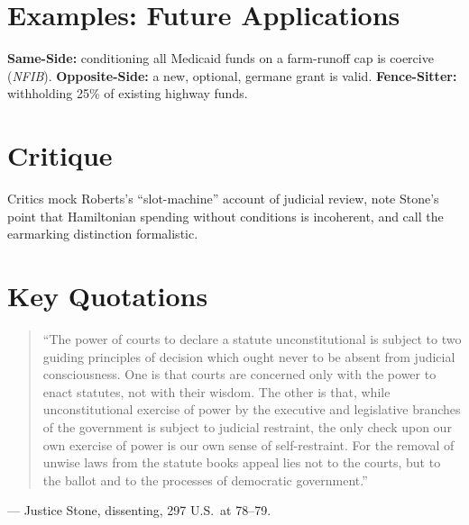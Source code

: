 \documentclass[12pt]{article}
\begin{document}
\section{Examples: Future Applications}
\textbf{Same-Side:} conditioning all Medicaid funds on a farm-runoff cap is coercive (\textit{NFIB}). \textbf{Opposite-Side:} a new, optional, germane grant is valid. \textbf{Fence-Sitter:} withholding 25\% of existing highway funds.

\section{Critique}
Critics mock Roberts's ``slot-machine'' account of judicial review, note Stone's point that Hamiltonian spending without conditions is incoherent, and call the earmarking distinction formalistic.

\section{Key Quotations}
\begin{quote}
``The power of courts to declare a statute unconstitutional is subject to two guiding principles of decision which ought never to be absent from judicial consciousness. One is that courts are concerned only with the power to enact statutes, not with their wisdom. The other is that, while unconstitutional exercise of power by the executive and legislative branches of the government is subject to judicial restraint, the only check upon our own exercise of power is our own sense of self-restraint. For the removal of unwise laws from the statute books appeal lies not to the courts, but to the ballot and to the processes of democratic government.''
\end{quote}
\noindent --- Justice Stone, dissenting, 297 U.S.\ at 78--79.
\end{document}
